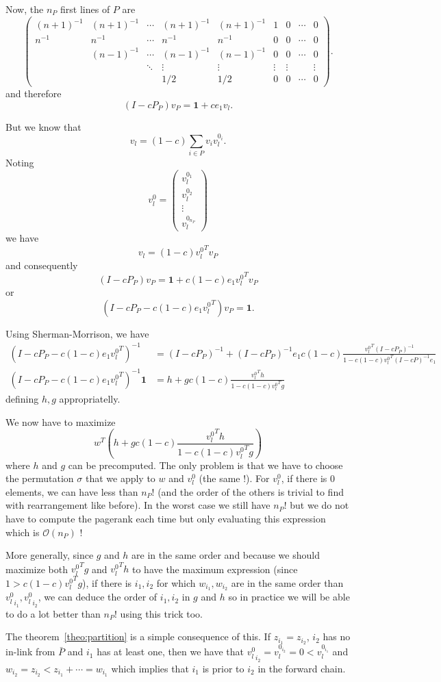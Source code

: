 \documentclass{article}
\newcommand{\bigoh}{\mathcal{O}}
\newcommand{\1}{\mathbf{1}}
\theoremstyle{definition}
\begin{document}
Now, the $n_P$ first lines of $P$ are
\[
  \begin{pmatrix}
    (n+1)^{-1} & (n+1)^{-1} & \cdots & (n+1)^{-1} & (n+1)^{-1} & 1 & 0 & \cdots & 0\\
    n^{-1} & n^{-1} & \cdots & n^{-1} & n^{-1} & 0 & 0 & \cdots & 0\\
           & (n-1)^{-1} & \cdots & (n-1)^{-1} & (n-1)^{-1} & 0 & 0 & \cdots & 0\\
           & & \ddots & \vdots & \vdots & \vdots & \vdots & & \vdots \\
           & & & 1/2 & 1/2 & 0 & 0 & \cdots & 0
  \end{pmatrix}.
\]
and therefore
\[ (I - cP_P)v_P = \1 + c e_1 v_l. \]

But we know that
\[ v_l = (1-c) \sum_{i \in P} v_i v_l^{0_i}. \]
Noting
\[ v_l^0 =
  \begin{pmatrix}
    v_l^{0_1} \\ v_l^{0_2} \\ \vdots \\ v_l^{0_{n_P}}
  \end{pmatrix}
\]
we have
\[ v_l = (1-c) {v_l^0}^T v_P \]
and consequently
\[ (I - cP_P)v_P = \1 + c (1-c) e_1 {v_l^0}^T v_P \]
or
\[ (I - cP_P - c (1-c) e_1 {v_l^0}^T)v_P = \1. \]

Using Sherman-Morrison, we have
\begin{align*}
  (I - cP_P - c (1-c) e_1 {v_l^0}^T)^{-1} & = (I - cP_P)^{-1} + (I - cP_P)^{-1}e_1 c(1-c) \frac{{v_l^0}^T(I-cP_P)^{-1}}{1 - c(1-c){v_l^0}^T(I-cP)^{-1}e_1}\\
  (I - cP_P - c (1-c) e_1 {v_l^0}^T)^{-1}\1 & = h + g c(1-c) \frac{{v_l^0}^Th}{1 - c(1-c){v_l^0}^Tg}
\end{align*}
defining $h,g$ appropriatelly.

We now have to maximize
\[ w^T \left(h + g c(1-c) \frac{{v_l^0}^Th}{1 - c(1-c){v_l^0}^Tg}\right) \]
where $h$ and $g$ can be precomputed.
The only problem is that we have to choose the permutation $\sigma$ that we apply to $w$ and $v_l^0$ (the same !).
For $v_l^0$, if there is 0 elements, we can have less than $n_P!$ (and the order of the others is trivial to find with rearrangement like before).
In the worst case we still have $n_P!$ but we do not have to compute the pagerank each time but only evaluating this expression which is $\bigoh(n_P)$ !

More generally, since $g$ and $h$ are in the same order  and because we should maximize both ${v_l^0}^Tg$ and ${v_l^0}^Th$ to have the maximum expression (since $1 > c(1-c){v_l^0}^Tg$),
if there is $i_1, i_2$ for which $w_{i_1}, w_{i_2}$ are in the same order than ${v_l^0}_{i_1}, {v_l^0}_{i_2}$,
we can deduce the order of $i_1, i_2$ in $g$ and $h$ so in practice we will be able to do a lot better than $n_P!$ using this trick too.

The theorem~\ref{theo:partition} is a simple consequence of this.
If $z_{i_1} = z_{i_2}$, $i_2$ has no in-link from $\bar{P}$ and $i_1$ has at least one,
then we have that
${v_l^0}_{i_2} = v_l^{0_{i_2}} = 0 < v_l^{0_{i_1}}$ and $w_{i_2} = z_{i_2} < z_{i_1} + \cdots = w_{i_1}$
which implies that $i_1$ is prior to $i_2$ in the forward chain.



\end{document}
